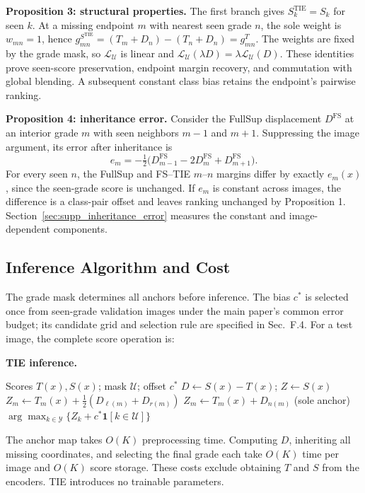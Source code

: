 \noindent\textbf{Proposition 3: structural properties.}
The first branch gives $S_k^{\mathrm{TIE}}=S_k$ for seen $k$. At a missing endpoint $m$ with nearest seen grade $n$, the sole weight is $w_{mn}=1$, hence
$g^{S^{\mathrm{TIE}}}_{mn}=(T_m+D_n)-(T_n+D_n)=g^T_{mn}$.
The weights are fixed by the grade mask, so $\mathcal L_{\mathcal U}$ is linear and $\mathcal L_{\mathcal U}(\lambda D)=\lambda\mathcal L_{\mathcal U}(D)$. These identities prove seen-score preservation, endpoint margin recovery, and commutation with global blending. A subsequent constant class bias retains the endpoint's pairwise ranking.

\noindent\textbf{Proposition 4: inheritance error.}
Consider the FullSup displacement $D^{\mathrm{FS}}$ at an interior grade $m$ with seen neighbors $m-1$ and $m+1$. Suppressing the image argument, its error after inheritance is
\begin{equation}
 e_m=-\tfrac12\bigl(D^{\mathrm{FS}}_{m-1}-2D^{\mathrm{FS}}_m+D^{\mathrm{FS}}_{m+1}\bigr).
 \label{eq:supp_curvature_proof}
\end{equation}
For every seen $n$, the FullSup and FS--TIE $m$--$n$ margins differ by exactly $e_m(x)$, since the seen-grade score is unchanged. If $e_m$ is constant across images, the difference is a class-pair offset and leaves ranking unchanged by Proposition 1. Section~\ref{sec:supp_inheritance_error} measures the constant and image-dependent components.

\subsection{Inference Algorithm and Cost}
\label{sec:supp_inference}

The grade mask determines all anchors before inference. The bias $c^*$ is selected once from seen-grade validation images under the main paper's common error budget; its candidate grid and selection rule are specified in Sec.~F.4. For a test image, the complete score operation is:

\noindent\textbf{TIE inference.}
\begin{algorithmic}[1]
 \Require Scores $T(x),S(x)$; mask $\mathcal U$; offset $c^*$
 \State $D\gets S(x)-T(x)$; $Z\gets S(x)$
   \State $Z_m\gets T_m(x)+\tfrac12(D_{\ell(m)}+D_{r(m)})$
  \Else
   \State $Z_m\gets T_m(x)+D_{n(m)}$ (sole anchor)
  \EndIf
 \EndFor
 \State \Return $\displaystyle\arg\max_{k\in\mathcal Y}\{Z_k+c^*\mathbf1[k\in\mathcal U]\}$
\end{algorithmic}

The anchor map takes $O(K)$ preprocessing time. Computing $D$, inheriting all missing coordinates, and selecting the final grade each take $O(K)$ time per image and $O(K)$ score storage. These costs exclude obtaining $T$ and $S$ from the encoders. TIE introduces no trainable parameters.
